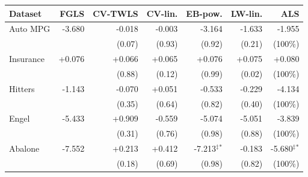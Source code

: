 \begin{tabular}{@{}lrrrrrr@{}}
\toprule
Dataset & FGLS & CV-TWLS & CV-lin. & EB-pow. & LW-lin. & ALS \\
\midrule
Auto MPG & -3.680 & -0.018 & -0.003 & -3.164 & -1.633 & -1.955 \\
 &  & (0.07) & (0.93) & (0.92) & (0.21) & (100\%) \\
Insurance & +0.076 & +0.066 & +0.065 & +0.076 & +0.075 & +0.080 \\
 &  & (0.88) & (0.12) & (0.99) & (0.02) & (100\%) \\
Hitters & -1.143 & -0.070 & +0.051 & -0.533 & -0.229 & -4.134 \\
 &  & (0.35) & (0.64) & (0.82) & (0.40) & (100\%) \\
Engel & -5.433 & +0.909 & -0.559 & -5.074 & -5.051 & -3.839 \\
 &  & (0.31) & (0.76) & (0.98) & (0.88) & (100\%) \\
Abalone & -7.552 & +0.213 & +0.412 & -7.213$^{\ddagger}$$^{*}$ & -0.183 & -5.680$^{\ddagger}$$^{*}$ \\
 &  & (0.18) & (0.69) & (0.98) & (0.82) & (100\%) \\
\bottomrule
\end{tabular}
